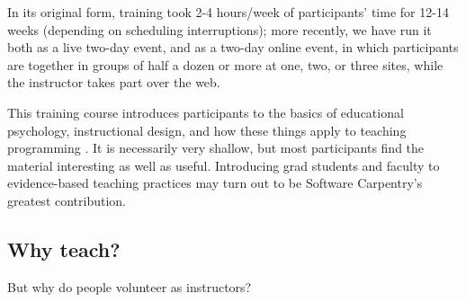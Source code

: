 \documentclass[10pt,a4paper,twocolumn]{article}
\begin{document}
In its original form, training took 2-4 hours/week of participants'
time for 12-14 weeks (depending on scheduling interruptions); more
recently, we have run it both as a live two-day event, and as a
two-day online event, in which participants are together in groups of
half a dozen or more at one, two, or three sites, while the instructor
takes part over the web.

This training course introduces participants to the basics of
educational psychology, instructional design, and how these things
apply to teaching programming
\cite{guzdial2010,guzdial2013,hazzan2011,porter2013,sorva2012}. It is
necessarily very shallow, but most participants find the material
interesting as well as useful.  Introducing grad students and faculty
to evidence-based teaching practices may turn out to be Software
Carpentry's greatest contribution.

\subsection{Why teach?}

But why do people volunteer as instructors?
\end{document}
